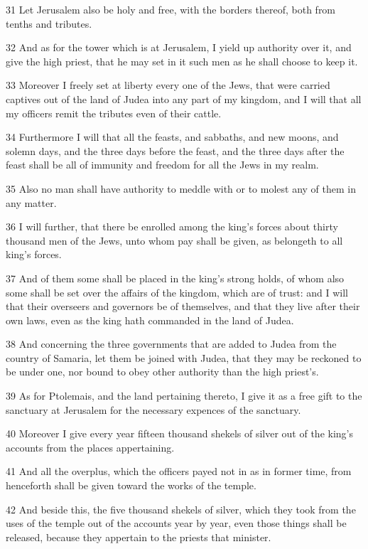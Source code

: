 \par 31 Let Jerusalem also be holy and free, with the borders thereof, both from tenths and tributes.
\par 32 And as for the tower which is at Jerusalem, I yield up authority over it, and give the high priest, that he may set in it such men as he shall choose to keep it.
\par 33 Moreover I freely set at liberty every one of the Jews, that were carried captives out of the land of Judea into any part of my kingdom, and I will that all my officers remit the tributes even of their cattle.
\par 34 Furthermore I will that all the feasts, and sabbaths, and new moons, and solemn days, and the three days before the feast, and the three days after the feast shall be all of immunity and freedom for all the Jews in my realm.
\par 35 Also no man shall have authority to meddle with or to molest any of them in any matter.
\par 36 I will further, that there be enrolled among the king's forces about thirty thousand men of the Jews, unto whom pay shall be given, as belongeth to all king's forces.
\par 37 And of them some shall be placed in the king's strong holds, of whom also some shall be set over the affairs of the kingdom, which are of trust: and I will that their overseers and governors be of themselves, and that they live after their own laws, even as the king hath commanded in the land of Judea.
\par 38 And concerning the three governments that are added to Judea from the country of Samaria, let them be joined with Judea, that they may be reckoned to be under one, nor bound to obey other authority than the high priest's.
\par 39 As for Ptolemais, and the land pertaining thereto, I give it as a free gift to the sanctuary at Jerusalem for the necessary expences of the sanctuary.
\par 40 Moreover I give every year fifteen thousand shekels of silver out of the king's accounts from the places appertaining.
\par 41 And all the overplus, which the officers payed not in as in former time, from henceforth shall be given toward the works of the temple.
\par 42 And beside this, the five thousand shekels of silver, which they took from the uses of the temple out of the accounts year by year, even those things shall be released, because they appertain to the priests that minister.
